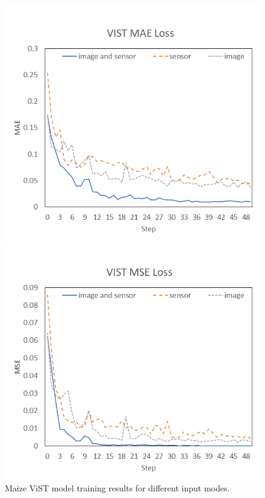 \documentclass[acmsmall,manuscript, screen, review]{acmart}
\begin{document}
  \begin{figure}[htbp]
    \centering
    \begin{minipage}{0.49\linewidth}
      \centering
      \includegraphics[width=\linewidth]{pic/res_corn_vist_mae.png}
    \end{minipage}
    \centering
    \begin{minipage}{0.49\linewidth}
      \centering
      \includegraphics[width=\linewidth]{pic/res_corn_vist_mse.png}
    \end{minipage}
  
    \caption{Maize ViST model training results for different input modes. \label{maize_vist_results}}
  \end{figure}
\end{document}

